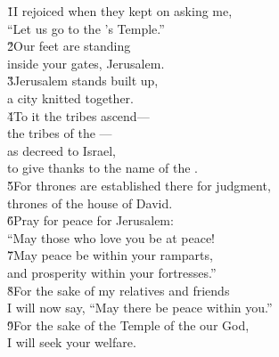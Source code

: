 \begin{poetry}
\poeml \v{1}I rejoiced when they kept on asking me, \\
\poemll    ``Let us go to the 's Temple.'' \\
\poeml \v{2}Our feet are standing \\
\poemll    inside your gates, Jerusalem. \\
\poeml \v{3}Jerusalem stands built up, \\
\poemll    a city knitted together. \\
\poeml \v{4}To it the tribes ascend--- \\
\poemll    the tribes of the --- \\
\poeml as decreed to Israel, \\
\poemll    to give thanks to the name of the . \\
\poeml \v{5}For thrones are established there for judgment, \\
\poemll    thrones of the house of David. \\
\poeml \v{6}Pray for peace for Jerusalem: \\
\poemll    ``May those who love you be at peace! \\
\poeml \v{7}May peace be within your ramparts, \\
\poemll    and prosperity within your fortresses.'' \\
\poeml \v{8}For the sake of my relatives and friends \\
\poemll    I will now say, ``May there be peace within you.'' \\
\poeml \v{9}For the sake of the Temple of the  our God, \\
\poemll    I will seek your welfare.
\end{poetry}

